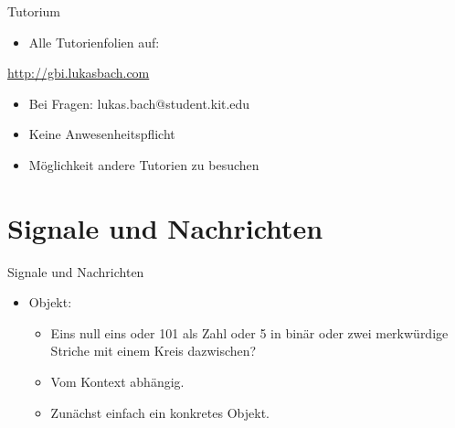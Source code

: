 \begin{frame}{Tutorium}
	\begin{itemize}
		\item Alle Tutorienfolien auf:\pause
	\end{itemize}
	
	\begin{center}
		\url{http://gbi.lukasbach.com}
	\end{center}
	\pause
	
	\begin{itemize}
		\item Bei Fragen: lukas.bach@student.kit.edu\pause
		\item Keine Anwesenheitspflicht\pause
		\item Möglichkeit andere Tutorien zu besuchen
	\end{itemize}
\end{frame}


\section{Signale und Nachrichten}

\begin{frame}{Signale und Nachrichten}
	\begin{itemize}
		\pause\item Objekt: 
		\begin{itemize}
			\pause\item Eins null eins \pause oder 101 als Zahl \pause oder 5 in binär \pause oder zwei merkwürdige Striche mit einem Kreis dazwischen?
			\pause\item Vom Kontext abhängig.
			\pause\item Zunächst einfach ein konkretes Objekt.
		\end{itemize}
	\end{itemize}
\end{frame}

